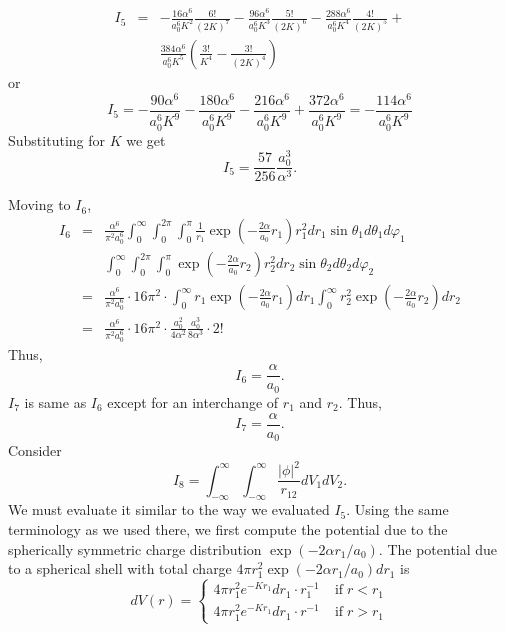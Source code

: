 \documentclass{article}
\numberwithin{equation}{section}
\begin{document}
\begin{eqnarray*}
I_5 &=& -\frac{16\alpha^6}{a_0^6K^2}\frac{6!}{(2K)^7} -
 \frac{96\alpha^6}{a_0^6K^3}\frac{5!}{(2K)^6} - 
 \frac{288\alpha^6}{a_0^6K^4}\frac{4!}{(2K)^5} + \\
 & & \frac{384\alpha^6}{a_0^6 K^5}\left(\frac{3!}{K^4} - \frac{3!}{(2K)^4}
	 \right)
\end{eqnarray*}
or
\[
I_5 = -\frac{90\alpha^6}{a_0^6K^9} - \frac{180\alpha^6}{a_0^6K^9} - 
 \frac{216\alpha^6}{a_0^6K^9} + \frac{372\alpha^6}{a_0^6 K^9}
 = -\frac{114\alpha^6}{a_0^6K^9}
\]
Substituting for $K$ we get
\begin{equation}\label{s5e79}
I_5 = \frac{57}{256}\frac{a_0^3}{\alpha^3}.
\end{equation}

Moving to $I_6$,
\begin{eqnarray*}
I_6 &=& \frac{\alpha^6}{\pi^2 a_0^6}
\int_0^\infty\int_0^{2\pi}\int_0^\pi
\frac{1}{r_1}\exp\left(-\frac{2\alpha}{a_0}r_1\right)
r_1^2dr_1\sin\theta_1d\theta_1d\varphi_1 \\
 & & 
\int_0^\infty\int_0^{2\pi}\int_0^\pi
\exp\left(-\frac{2\alpha}{a_0}r_2\right)
r_2^2dr_2\sin\theta_2d\theta_2d\varphi_2 \\
&=& \frac{\alpha^6}{\pi^2 a_0^6} \cdot 16\pi^2 \cdot
\int_0^\infty r_1\exp\left(-\frac{2\alpha}{a_0}r_1\right)dr_1
\int_0^\infty r_2^2\exp\left(-\frac{2\alpha}{a_0}r_2\right)dr_2 \\
&=& \frac{\alpha^6}{\pi^2 a_0^6} \cdot 16\pi^2 \cdot
\frac{a_0^2}{4\alpha^2}\frac{a_0^3}{8\alpha^3}\cdot 2!
\end{eqnarray*}
Thus,
\begin{equation}\label{s5e80}
I_6 = \frac{\alpha}{a_0}.
\end{equation}
$I_7$ is same as $I_6$ except for an interchange of $r_1$ and $r_2$. Thus,
\begin{equation}\label{s5e81}
I_7 = \frac{\alpha}{a_0}.
\end{equation}
Consider
\[
I_8 = \int_{-\infty}^\infty\int_{-\infty}^\infty\frac{|\phi|^2}{r_{12}}
dV_1 dV_2.
\]
We must evaluate it similar to the way we evaluated $I_5$. Using the same
terminology as we used there, we first compute the potential due to the
spherically symmetric charge distribution $\exp(-2\alpha r_1/a_0)$. The
potential due to a spherical shell with total charge $4\pi r_1^2 \exp(
-2\alpha r_1/a_0)dr_1$ is
\[
dV(r) = \begin{cases}
4\pi r_1^2e^{-Kr_1}dr_1 \cdot r_1^{-1} & \;\text{if}\; r < r_1 \\
4\pi r_1^2e^{-Kr_1}dr_1 \cdot r^{-1}   & \;\text{if}\; r > r_1
\end{cases}
\]
\end{document}
